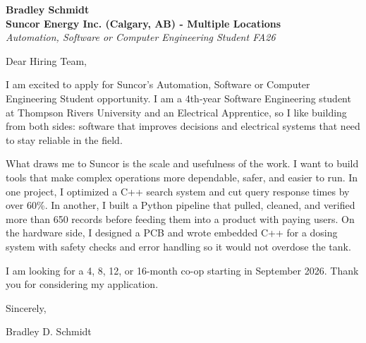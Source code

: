 \documentclass[11pt]{article}
\begin{document}
\textbf{Bradley Schmidt}\\
\vspace{0.5em}
\textbf{Suncor Energy Inc. (Calgary, AB) - Multiple Locations}\\
\textit{Automation, Software or Computer Engineering Student FA26}

Dear Hiring Team,

\par

I am excited to apply for Suncor's Automation, Software or Computer Engineering Student opportunity. I am a 4th-year Software Engineering student at Thompson Rivers University and an Electrical Apprentice, so I like building from both sides: software that improves decisions and electrical systems that need to stay reliable in the field.

\par

What draws me to Suncor is the scale and usefulness of the work. I want to build tools that make complex operations more dependable, safer, and easier to run. In one project, I optimized a C++ search system and cut query response times by over 60\%. In another, I built a Python pipeline that pulled, cleaned, and verified more than 650 records before feeding them into a product with paying users. On the hardware side, I designed a PCB and wrote embedded C++ for a dosing system with safety checks and error handling so it would not overdose the tank.

\par

I am looking for a 4, 8, 12, or 16-month co-op starting in September 2026. Thank you for considering my application.

\par

Sincerely,

\par

Bradley D. Schmidt
\end{document}
